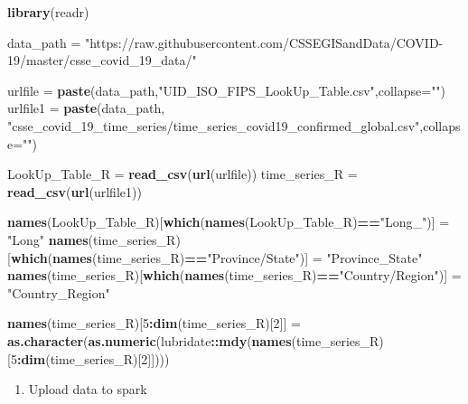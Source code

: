 \documentclass[
]{article}
\newenvironment{Shaded}{\begin{snugshade}}{\end{snugshade}}
\newcommand{\AttributeTok}[1]{\textcolor[rgb]{0.13,0.29,0.53}{#1}}
\newcommand{\DecValTok}[1]{\textcolor[rgb]{0.00,0.00,0.81}{#1}}
\newcommand{\FunctionTok}[1]{\textcolor[rgb]{0.13,0.29,0.53}{\textbf{#1}}}
\newcommand{\NormalTok}[1]{#1}
\newcommand{\OtherTok}[1]{\textcolor[rgb]{0.56,0.35,0.01}{#1}}
\newcommand{\SpecialCharTok}[1]{\textcolor[rgb]{0.81,0.36,0.00}{\textbf{#1}}}
\newcommand{\StringTok}[1]{\textcolor[rgb]{0.31,0.60,0.02}{#1}}
\providecommand{\tightlist}{%
  \setlength{\itemsep}{0pt}\setlength{\parskip}{0pt}}
\begin{document}
\begin{Shaded}
\begin{Highlighting}[]
\FunctionTok{library}\NormalTok{(readr)}

\NormalTok{data\_path }\OtherTok{=} 
  \StringTok{"https://raw.githubusercontent.com/CSSEGISandData/COVID{-}19/master/csse\_covid\_19\_data/"}

\NormalTok{urlfile }\OtherTok{=} \FunctionTok{paste}\NormalTok{(data\_path,}\StringTok{"UID\_ISO\_FIPS\_LookUp\_Table.csv"}\NormalTok{,}\AttributeTok{collapse=}\StringTok{""}\NormalTok{)}
\NormalTok{urlfile1 }\OtherTok{=} \FunctionTok{paste}\NormalTok{(data\_path,}
      \StringTok{"csse\_covid\_19\_time\_series/time\_series\_covid19\_confirmed\_global.csv"}\NormalTok{,}\AttributeTok{collapse=}\StringTok{""}\NormalTok{)}

\NormalTok{LookUp\_Table\_R }\OtherTok{=} \FunctionTok{read\_csv}\NormalTok{(}\FunctionTok{url}\NormalTok{(urlfile))}
\NormalTok{time\_series\_R }\OtherTok{=} \FunctionTok{read\_csv}\NormalTok{(}\FunctionTok{url}\NormalTok{(urlfile1))}

\FunctionTok{names}\NormalTok{(LookUp\_Table\_R)[}\FunctionTok{which}\NormalTok{(}\FunctionTok{names}\NormalTok{(LookUp\_Table\_R)}\SpecialCharTok{==}\StringTok{"Long\_"}\NormalTok{)] }\OtherTok{=} \StringTok{"Long"}
\FunctionTok{names}\NormalTok{(time\_series\_R)[}\FunctionTok{which}\NormalTok{(}\FunctionTok{names}\NormalTok{(time\_series\_R)}\SpecialCharTok{==}\StringTok{"Province/State"}\NormalTok{)] }\OtherTok{=} \StringTok{"Province\_State"}
\FunctionTok{names}\NormalTok{(time\_series\_R)[}\FunctionTok{which}\NormalTok{(}\FunctionTok{names}\NormalTok{(time\_series\_R)}\SpecialCharTok{==}\StringTok{"Country/Region"}\NormalTok{)] }\OtherTok{=} \StringTok{"Country\_Region"}

\FunctionTok{names}\NormalTok{(time\_series\_R)[}\DecValTok{5}\SpecialCharTok{:}\FunctionTok{dim}\NormalTok{(time\_series\_R)[}\DecValTok{2}\NormalTok{]] }\OtherTok{=} 
  \FunctionTok{as.character}\NormalTok{(}\FunctionTok{as.numeric}\NormalTok{(lubridate}\SpecialCharTok{::}\FunctionTok{mdy}\NormalTok{(}\FunctionTok{names}\NormalTok{(time\_series\_R)[}\DecValTok{5}\SpecialCharTok{:}\FunctionTok{dim}\NormalTok{(time\_series\_R)[}\DecValTok{2}\NormalTok{]])))}
\end{Highlighting}
\end{Shaded}

\begin{enumerate}
\def\labelenumi{\arabic{enumi}.}
\setcounter{enumi}{1}
\tightlist
\item
  Upload data to spark
\end{enumerate}
\end{document}
